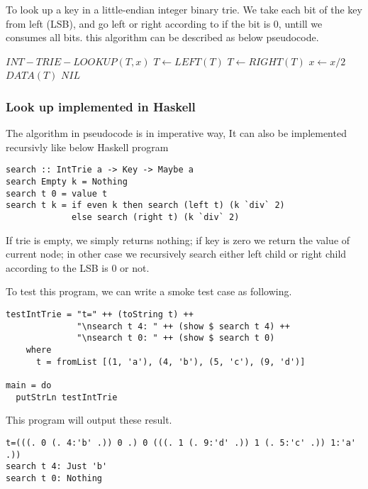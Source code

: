 \documentclass{article}
\begin{document}
To look up a key in a little-endian integer binary trie. We take each
bit of the key from left (LSB), and go left or right according to if
the bit is 0, untill we consumes all bits. this algorithm can be described
as below pseudocode.

\begin{algorithmic}
\STATE $INT-TRIE-LOOKUP(T, x)$
      \STATE $T \leftarrow LEFT(T)$
    \ELSE
      \STATE $T \leftarrow RIGHT(T)$
    \ENDIF
    \STATE $x \leftarrow x/2$
  \ENDWHILE
   \RETURN $DATA(T)$
  \ELSE \RETURN $NIL$ \ENDIF
\end{algorithmic}

\subsubsection*{Look up implemented in Haskell}
The algorithm in pseudocode is in imperative way, It can also be implemented 
recursivly like below Haskell program

\lstset{language=Haskell}
\begin{lstlisting}
search :: IntTrie a -> Key -> Maybe a
search Empty k = Nothing
search t 0 = value t
search t k = if even k then search (left t) (k `div` 2)
             else search (right t) (k `div` 2)
\end{lstlisting}

If trie is empty, we simply returns nothing; if key is zero we return the 
value of current node; in other case we recursively search either left
child or right child according to the LSB is 0 or not.

To test this program, we can write a smoke test case as following.

\begin{lstlisting}
testIntTrie = "t=" ++ (toString t) ++ 
              "\nsearch t 4: " ++ (show $ search t 4) ++
              "\nsearch t 0: " ++ (show $ search t 0)
    where
      t = fromList [(1, 'a'), (4, 'b'), (5, 'c'), (9, 'd')]

main = do
  putStrLn testIntTrie
\end{lstlisting}

This program will output these result.

\begin{verbatim}
t=(((. 0 (. 4:'b' .)) 0 .) 0 (((. 1 (. 9:'d' .)) 1 (. 5:'c' .)) 1:'a' .))
search t 4: Just 'b'
search t 0: Nothing
\end{verbatim}
\end{document}
